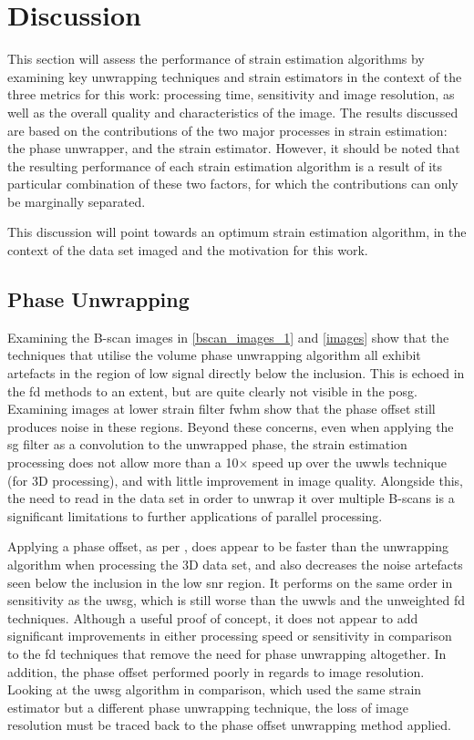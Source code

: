 \chapter{Discussion}

This section will assess the performance of strain estimation algorithms by examining key unwrapping techniques and strain estimators in the context of the three metrics for this work: processing time, sensitivity and image resolution, as well as the overall quality and characteristics of the image. 
The results discussed are based on the contributions of the two major processes in strain estimation: the phase unwrapper, and the strain estimator. However, it should be noted that the resulting performance of each strain estimation algorithm is a result of its particular combination of these two factors, for which the contributions can only be marginally separated.

This discussion will point towards an optimum strain estimation algorithm, in the context of the data set imaged and the motivation for this work. 

\section{Phase Unwrapping}

Examining the B-scan images in \autoref{bscan_images_1} and \autoref{images} show that the techniques that utilise the volume phase unwrapping algorithm all exhibit artefacts in the region of low signal directly below the inclusion. This is echoed in the \ac{fd} methods to an extent, but are quite clearly not visible in the \ac{posg}. Examining images at lower strain filter \ac{fwhm} show that the phase offset still produces noise in these regions. 
Beyond these concerns, even when applying the \ac{sg} filter as a convolution to the unwrapped phase, the strain estimation processing does not allow more than a 10$\times$ speed up over the \ac{uwwls} technique (for 3D processing), and with little improvement in image quality. Alongside this, the need to read in the data set in order to unwrap it over multiple B-scans is a significant limitations to further applications of parallel processing.

Applying a phase offset, as per \cite{zaitsev_hybrid_2016}, does appear to be faster than the unwrapping algorithm when processing the 3D data set, and also decreases the noise artefacts seen below the inclusion in the low \ac{snr} region. It performs on the same order in sensitivity as the \ac{uwsg}, which is still worse than the \ac{uwwls} and the unweighted \ac{fd} techniques. Although a useful proof of concept, it does not appear to add significant improvements in either processing speed or sensitivity in comparison to the \ac{fd} techniques that remove the need for phase unwrapping altogether. In addition, the phase offset performed poorly in regards to image resolution. Looking at the \ac{uwsg} algorithm in comparison, which used the same strain estimator but a different phase unwrapping technique, the loss of image resolution must be traced back to the phase offset unwrapping method applied.

